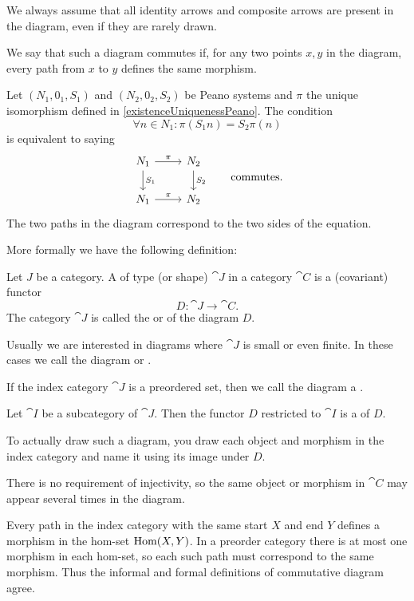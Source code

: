 We always assume that all identity arrows and composite arrows are present in the diagram, even if they are rarely drawn.

We say that such a diagram commutes if, for any two points $x,y$ in the diagram, every path from $x$ to $y$ defines the same morphism.

\begin{example}
Let $(N_1, 0_1, S_1)$ and $(N_2, 0_2, S_2)$ be Peano systems and $\pi$ the unique isomorphism defined in \ref{existenceUniquenessPeano}. The condition
\[ \forall n\in N_1: \pi(S_1n) = S_2\pi(n) \]
is equivalent to saying
\[ \begin{tikzcd}
N_1 \ar[r, "\pi"] \ar[d, "S_1"] & N_2 \ar[d, "S_2"] \\
N_1 \ar[r, "\pi"] & N_2
\end{tikzcd} \qquad \text{commutes.} \]
The two paths in the diagram correspond to the two sides of the equation.
\end{example}

More formally we have the following definition:
\begin{definition}
Let $J$ be a category.
A  of type (or shape) $\cat{J}$ in a category $\cat{C}$ is a (covariant) functor
\[ D: \cat{J} \to \cat{C}. \]
The category $\cat{J}$ is called the  or  of the diagram $D$.

Usually we are interested in diagrams where $\cat{J}$ is small or even finite. In these cases we call the diagram  or .

If the index category $\cat{J}$ is a preordered set, then we call the diagram a .

Let $\cat{I}$ be a subcategory of $\cat{J}$. Then the functor $D$ restricted to $\cat{I}$ is a  of $D$.
\end{definition}
To actually draw such a diagram, you draw each object and morphism in the index category and name it using its image under $D$.

There is no requirement of injectivity, so the same object or morphism in $\cat{C}$ may appear several times in the diagram.

Every path in the index category with the same start $X$ and end $Y$ defines a morphism in the hom-set $\operatorname{Hom}(X,Y)$. In a preorder category there is at most one morphism in each hom-set, so each such path must correspond to the same morphism. Thus the informal and formal definitions of commutative diagram agree.

